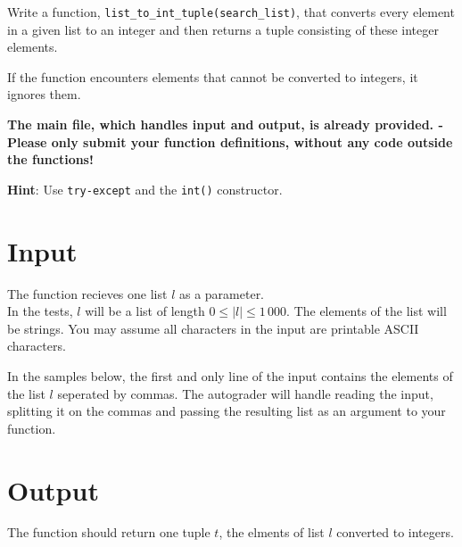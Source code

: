 
Write a function, \texttt{list\_to\_int\_tuple(search\_list)},
that converts every element in a given list to an integer and then returns a tuple consisting of these integer elements.

If the function encounters elements that cannot be converted to integers, it ignores them.

\textbf{The main file, which handles input and output, is already provided. -
Please only submit your function definitions, without any code outside the functions!}


\textbf{Hint}: Use \texttt{try-except} and the \texttt{int()} constructor.

\section*{Input}
The function recieves one list $l$ as a parameter.\\
In the tests, $l$ will be a list of length $0 \leq |l| \leq 1\,000$.
The elements of the list will be strings.
You may assume all characters in the input are printable ASCII characters.

In the samples below,
the first and only line of the input contains the elements of the list $l$ seperated by commas.
The autograder will handle reading the input,
splitting it on the commas
and passing the resulting list as an argument to your function.

\section*{Output}
The function should return one tuple $t$,
the elments of list $l$ converted to integers.
